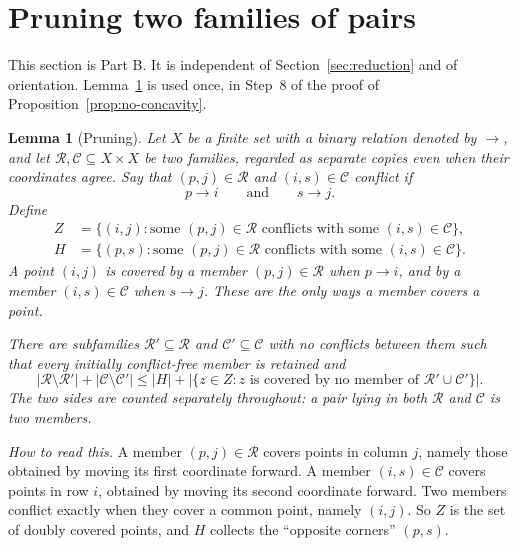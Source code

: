\documentclass[11pt]{article}
\newtheorem{lemma}[theorem]{Lemma}
\theoremstyle{remark}
\newcommand{\abs}[1]{\lvert #1\rvert}
\begin{document}
\section{Pruning two families of pairs}\label{sec:pruning}

This section is Part B.  It is independent of Section~\ref{sec:reduction} and
of orientation.  Lemma~\ref{lem:pruning} is used once, in Step~8 of the proof
of Proposition~\ref{prop:no-concavity}.

\begin{lemma}[Pruning]\label{lem:pruning}
Let $X$ be a finite set with a binary relation denoted by $\to$, and let
$\mathcal R,\mathcal C\subseteq X\times X$ be two families, regarded as
separate copies even when their coordinates agree.  Say that
$(p,j)\in\mathcal R$ and $(i,s)\in\mathcal C$ \emph{conflict} if
\[
 p\to i\qquad\text{and}\qquad s\to j.
\]
Define
\begin{align*}
 Z&=\{(i,j):\text{some }(p,j)\in\mathcal R
       \text{ conflicts with some }(i,s)\in\mathcal C\},\\
 H&=\{(p,s):\text{some }(p,j)\in\mathcal R
       \text{ conflicts with some }(i,s)\in\mathcal C\}.
\end{align*}
A point $(i,j)$ is \emph{covered} by a member $(p,j)\in\mathcal R$ when
$p\to i$, and by a member $(i,s)\in\mathcal C$ when $s\to j$.
These are the only ways a member covers a point.

There are subfamilies $\mathcal R'\subseteq\mathcal R$ and
$\mathcal C'\subseteq\mathcal C$ with no conflicts between them such that
every initially conflict-free member is retained and
\begin{equation}\label{eq:pruning-bound}
 \abs{\mathcal R\setminus\mathcal R'}+
 \abs{\mathcal C\setminus\mathcal C'}
 \leq \abs H+
 \abs{\{z\in Z:z\text{ is covered by no member of }
                    \mathcal R'\cup\mathcal C'\}}.
\end{equation}
The two sides are counted separately throughout: a pair lying in both
$\mathcal R$ and $\mathcal C$ is two members.
\end{lemma}

\emph{How to read this.}  A member $(p,j)\in\mathcal R$ covers points in
column $j$, namely those obtained by moving its first coordinate forward.
A member $(i,s)\in\mathcal C$ covers points in row $i$, obtained by moving
its second coordinate forward.  Two members conflict exactly when they cover
a common point, namely $(i,j)$.  So $Z$ is the set of doubly covered points,
and $H$ collects the ``opposite corners'' $(p,s)$.
\end{document}
